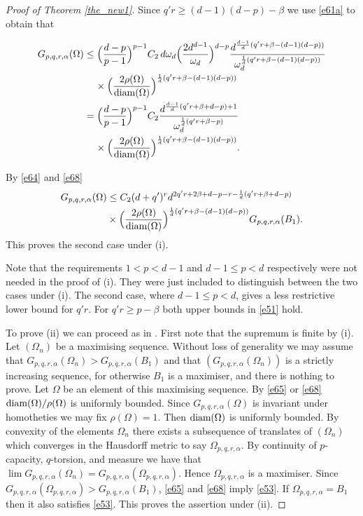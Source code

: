 \documentclass[a4paper,9pt]{article}
\newcommand{\Om}{\Omega}
\begin{document}
\begin{proof}[Proof of Theorem \ref{the_new1}]
Since $q'r\ge (d-1)(d-p)-\beta$ we use \eqref{e61a} to obtain that

\begin{align}\label{e68}
 G_{p,q,r,\alpha }(\Om)&\le \Big(\frac{d-p}{p-1}\Big)^{p-1}C_2\,d\omega_d\Big(\frac{2d^{d-1}}{\omega_d}\Big)^{d-p}\frac{d^{\frac{d-1}{d}(q'r+\beta-(d-1)(d-p))}}{\omega^{\frac1d(q'r+\beta-(d-1)(d-p))}_d}\nonumber\\&
 \hspace{4mm}\times\Big(\frac{2\rho(\Om)}{\textup{diam}(\Om)}\Big)^{\frac1d(q'r+\beta-(d-1)(d-p))}\nonumber\\&
 =\Big(\frac{d-p}{p-1}\Big)^{p-1}C_2\frac{d^{\frac{d-1}{d}(q'r+\beta+d-p)+1}}{\omega_d^{\frac1d(q'r+\beta-p)}}\nonumber\\&\hspace{4mm}\times\Big(\frac{2\rho(\Om)}{\textup{diam}(\Om)}\Big)^{\frac1d(q'r+\beta-(d-1)(d-p))}.
\end{align}

By \eqref{e64} and \eqref{e68}
\begin{align*}%
 G_{p,q,r,\alpha}(\Om)&\le C_2(d+q')^rd^{2q'r+2\beta+d-p-r-\frac1d(q'r+\beta+d-p)}\nonumber\\&\times\Big(\frac{2\rho(\Om)}{\textup{diam}(\Om)}\Big)^{\frac1d(q'r+\beta-(d-1)(d-p))}G_{p,q,r,\alpha}(B_1).
\end{align*}
This proves the second case under (i).

Note that the requirements $1<p<d-1$ and $d-1\le p<d$ respectively were not needed in the proof of (i). They were just included to distinguish between the two cases under (i). The second case, where $d-1\le p<d$, gives a less restrictive lower bound for $q'r$. For $q'r\ge p-\beta$ both upper bounds in \eqref{e51} hold.

\smallskip

To prove (ii) we can proceed as in \cite{MB}. First note that the supremum is finite by (i). Let $(\Om_n)$ be a maximising sequence. Without loss of generality we may assume that  $G_{p,q,r,\alpha}(\Om_n)>G_{p,q,r,\alpha}(B_1)$ and that $(G_{p,q,r,\alpha}(\Om_n))$  is a strictly increasing sequence, for otherwise $B_1$ is a maximiser, and there is nothing to prove. Let $\Om$ be an element of this maximising sequence. By \eqref{e65} or \eqref{e68}
$\textup{diam}(\Om)/\rho(\Om)$ is uniformly bounded. Since $G_{p,q,r,\alpha}(\Om)$ is invariant under homotheties we may fix $\rho(\Om)=1$. Then $\textup{diam}(\Om)$ is uniformly bounded. By convexity of the elements $\Om_n$ there exists a subsequence of translates of $(\Om_n)$ which converges in the Hausdorff metric to say $\Om_{p,q,r,\alpha}$. By continuity of $p$-capacity, $q$-torsion, and measure we have that $\lim G_{p,q,r,\alpha}(\Om_n)=G_{p,q,r,\alpha}(\Om_{p,q,r,\alpha}).$
Hence $\Om_{p,q,r,\alpha}$ is a maximiser. Since $G_{p,q,r,\alpha}(\Om_{p,q,r,\alpha})>G_{p,q,r,\alpha}(B_1)$, \eqref{e65} and \eqref{e68} imply \eqref{e53}. If $\Om_{p,q,r,\alpha}=B_1$ then it also satisfies \eqref{e53}. This proves the assertion under (ii).


\end{proof}
\end{document}

